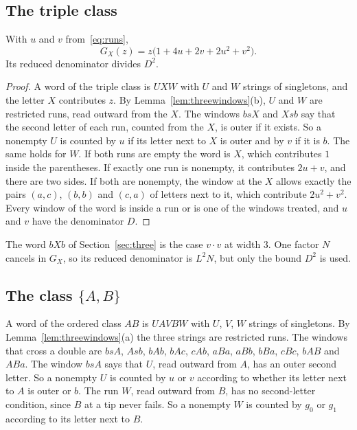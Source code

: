 \subsection{The triple class}

\begin{proposition}\label{prop:GX}
With $u$ and $v$ from~\eqref{eq:runs},
\begin{equation}\label{eq:GX}
G_X(z)=z\bigl(1+4u+2v+2u^2+v^2\bigr).
\end{equation}
Its reduced denominator divides $D^2$.
\end{proposition}

\begin{proof}
A word of the triple class is $UXW$ with $U$ and $W$ strings of singletons, and the letter $X$
contributes $z$. By Lemma~\ref{lem:threewindows}(b), $U$ and $W$ are restricted runs, read
outward from the $X$. The windows $bsX$ and $Xsb$ say that the second letter of each run,
counted from the $X$, is outer if it exists. So a nonempty $U$ is counted by $u$ if its letter
next to $X$ is outer and by $v$ if it is $b$. The same holds for $W$. If both runs are
empty the word is $X$, which contributes $1$ inside the parentheses. If exactly one run is
nonempty, it contributes $2u+v$, and there are two sides. If both are nonempty, the window at
the $X$ allows exactly the pairs $(a,c)$, $(b,b)$ and $(c,a)$ of letters next to it, which
contribute $2u^2+v^2$. Every window of the word is inside a run or is one of the windows
treated, and $u$ and $v$ have the denominator $D$.
\end{proof}

The word $bXb$ of Section~\ref{sec:three} is the case $v\cdot v$ at width $3$. One factor $N$
cancels in $G_X$, so its reduced denominator is $L^2N$, but only the bound $D^2$ is used.

\subsection{The class \texorpdfstring{$\{A,B\}$}{\{A,B\}}}

A word of the ordered class $AB$ is $UAVBW$ with $U$, $V$, $W$ strings of singletons. By
Lemma~\ref{lem:threewindows}(a) the three strings are restricted runs. The windows that cross
a double are $bsA$, $Asb$, $bAb$, $bAc$, $cAb$, $aBa$, $aBb$, $bBa$, $cBc$, $bAB$ and $ABa$.
The window $bsA$ says that $U$, read outward from $A$, has an outer second letter. So a
nonempty $U$ is counted by $u$ or $v$ according to whether its letter next to $A$ is outer or
$b$. The run $W$, read outward from $B$, has no second-letter condition, since $B$ at a tip
never fails. So a nonempty $W$ is counted by $g_0$ or $g_1$ according to its letter next to $B$.

